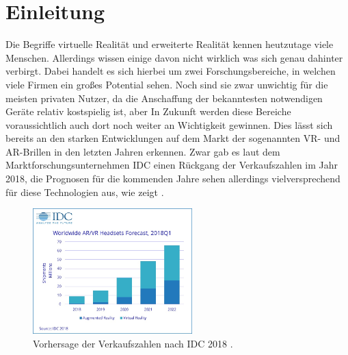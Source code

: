 
\chapter{Einleitung}\label{chapter:introduction}

	
	
	Die Begriffe virtuelle Realität und erweiterte Realität kennen heutzutage viele Menschen. Allerdings wissen einige davon nicht wirklich was sich genau dahinter verbirgt. Dabei handelt es sich hierbei um zwei Forschungsbereiche, in welchen viele Firmen ein großes Potential sehen. Noch sind sie zwar unwichtig für die meisten privaten Nutzer, da die Anschaffung der bekanntesten notwendigen Geräte relativ kostspielig ist, aber In Zukunft werden diese Bereiche voraussichtlich auch dort noch weiter an Wichtigkeit gewinnen.
	Dies lässt sich bereits an den starken Entwicklungen auf dem Markt der sogenannten VR- und AR-Brillen in den letzten Jahren erkennen.
	Zwar gab es laut dem Marktforschungsunternehmen IDC einen Rückgang der Verkaufszahlen im Jahr 2018, die Prognosen für die kommenden Jahre sehen allerdings vielversprechend für diese Technologien aus, wie  zeigt \cite{verkaufVR}.
	
	\begin{figure}[htbp]
		\centering
		\includegraphics[width=0.55\textwidth]{figures/IDC-2018.jpg}
		\caption{Vorhersage der Verkaufszahlen nach IDC 2018 .}
		\label{fig:forecast_diagram}
	\end{figure}
	
